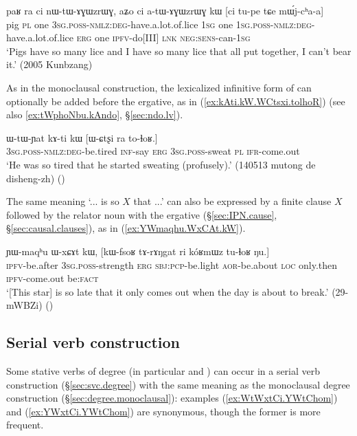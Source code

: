 \begin{exe}
\ex \label{ex:atAGWzrWG.kW}
\gll paʁ ra ci nɯ-tɯ-ɤɣɯzrɯɣ, aʑo ci a-tɯ-ɤɣɯzrɯɣ kɯ [ci tu-pe tɕe mɯ́j-cʰa-a] \\
pig \textsc{pl} one \textsc{3sg}.\textsc{poss}-\textsc{nmlz}:\textsc{deg}-have.a.lot.of.lice \textsc{1sg} one \textsc{1sg}.\textsc{poss}-\textsc{nmlz}:\textsc{deg}-have.a.lot.of.lice \textsc{erg} one \textsc{ipfv}-do[III] \textsc{lnk} \textsc{neg}:\textsc{sens}-can-\textsc{1sg} \\
\glt `Pigs have so many lice and I have so many lice that all put together, I can't bear it.' (2005 Kunbzang)
\end{exe}

As in the monoclausal construction, the lexicalized infinitive form  of  can optionally be added before the ergative, as in (\ref{ex:kAti.kW.WCtsxi.tolhoR}) (see also \ref{ex:tWphoNbu.kAndo}, §\ref{sec:ndo.lv}).
 
\begin{exe}
\ex \label{ex:kAti.kW.WCtsxi.tolhoR}
\gll ɯ-tɯ-ɲat kɤ-ti kɯ [ɯ-ɕtʂi ra to-ɬoʁ.] \\
\textsc{3sg}.\textsc{poss}-\textsc{nmlz}:\textsc{deg}-be.tired \textsc{inf}-say \textsc{erg} \textsc{3sg}.\textsc{poss}-sweat \textsc{pl} \textsc{ifr}-come.out \\
\glt `He was so tired that he started sweating (profusely).' (140513 mutong de disheng-zh)
()
\end{exe}

The same meaning `... is so $X$ that ...' can also be expressed by a finite clause $X$ followed by the relator noun  with the ergative  (§\ref{sec:IPN.cause}, §\ref{sec:causal.clauses}), as in (\ref{ex:YWmaqhu.WxCAt.kW}). 

\begin{exe}
\ex \label{ex:YWmaqhu.WxCAt.kW}
\gll ɲɯ-maqʰu ɯ-xɕɤt kɯ, [kɯ-fsoʁ tɤ-rɤŋgat ri kóʁmɯz tu-ɬoʁ ŋu.] \\
\textsc{ipfv}-be.after \textsc{3sg}.\textsc{poss}-strength \textsc{erg} \textsc{sbj}:\textsc{pcp}-be.light \textsc{aor}-be.about \textsc{loc} only.then \textsc{ipfv}-come.out be:\textsc{fact} \\
\glt `[This star] is so late that it only comes out when the day is about to break.' (29-mWBZi)
()
\end{exe}


\subsection{Serial verb construction} \label{sec:degree.svc}
Some stative verbs of degree (in particular  and ) can occur in a serial verb construction (§\ref{sec:svc.degree}) with the same meaning as the monoclausal degree construction (§\ref{sec:degree.monoclausal}): examples (\ref{ex:WtWxtCi.YWtChom}) and (\ref{ex:YWxtCi.YWtChom}) are synonymous, though the former is more frequent.

